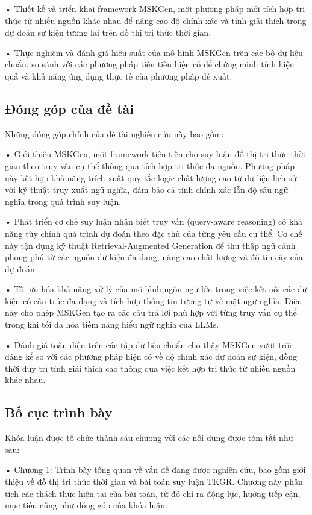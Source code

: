• Thiết kế và triển khai framework MSKGen, một phương pháp mới tích hợp tri thức từ nhiều nguồn khác nhau để nâng cao độ chính xác và tính giải thích trong dự đoán sự kiện tương lai trên đồ thị tri thức thời gian.

• Thực nghiệm và đánh giá hiệu suất của mô hình MSKGen trên các bộ dữ liệu chuẩn, so sánh với các phương pháp tiên tiến hiện có để chứng minh tính hiệu quả và khả năng ứng dụng thực tế của phương pháp đề xuất.

\subsection{Đóng góp của đề tài}
Những đóng góp chính của đề tài nghiên cứu này bao gồm:

• Giới thiệu MSKGen, một framework tiên tiến cho suy luận đồ thị tri thức thời gian theo truy vấn cụ thể thông qua tích hợp tri thức đa nguồn. Phương pháp này kết hợp khả năng trích xuất quy tắc logic chất lượng cao từ dữ liệu lịch sử với kỹ thuật truy xuất ngữ nghĩa, đảm bảo cả tính chính xác lẫn độ sâu ngữ nghĩa trong quá trình suy luận.

• Phát triển cơ chế suy luận nhận biết truy vấn (query-aware reasoning) có khả năng tùy chỉnh quá trình dự đoán theo đặc thù của từng yêu cầu cụ thể. Cơ chế này tận dụng kỹ thuật Retrieval-Augmented Generation để thu thập ngữ cảnh phong phú từ các nguồn dữ kiện đa dạng, nâng cao chất lượng và độ tin cậy của dự đoán.

• Tối ưu hóa khả năng xử lý của mô hình ngôn ngữ lớn trong việc kết nối các dữ kiện có cấu trúc đa dạng và tích hợp thông tin tương tự về mặt ngữ nghĩa. Điều này cho phép MSKGen tạo ra các câu trả lời phù hợp với từng truy vấn cụ thể trong khi tối đa hóa tiềm năng hiểu ngữ nghĩa của LLMs.

• Đánh giá toàn diện trên các tập dữ liệu chuẩn cho thấy MSKGen vượt trội đáng kể so với các phương pháp hiện có về độ chính xác dự đoán sự kiện, đồng thời duy trì tính giải thích cao thông qua việc kết hợp tri thức từ nhiều nguồn khác nhau.

\subsection{Bố cục trình bày}
Khóa luận được tổ chức thành sáu chương với các nội dung được tóm tắt như sau:

• Chương 1: Trình bày tổng quan về vấn đề đang được nghiên cứu, bao gồm giới thiệu về đồ thị tri thức thời gian và bài toán suy luận TKGR. Chương này phân tích các thách thức hiện tại của bài toán, từ đó chỉ ra động lực, hướng tiếp cận, mục tiêu cũng như đóng góp của khóa luận.

